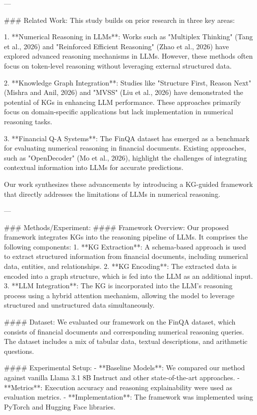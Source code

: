 ---

### Related Work:
This study builds on prior research in three key areas:

1. **Numerical Reasoning in LLMs**: Works such as "Multiplex Thinking" (Tang et al., 2026) and "Reinforced Efficient Reasoning" (Zhao et al., 2026) have explored advanced reasoning mechanisms in LLMs. However, these methods often focus on token-level reasoning without leveraging external structured data.

2. **Knowledge Graph Integration**: Studies like "Structure First, Reason Next" (Mishra and Anil, 2026) and "MVSS" (Liu et al., 2026) have demonstrated the potential of KGs in enhancing LLM performance. These approaches primarily focus on domain-specific applications but lack implementation in numerical reasoning tasks.

3. **Financial Q-A Systems**: The FinQA dataset has emerged as a benchmark for evaluating numerical reasoning in financial documents. Existing approaches, such as "OpenDecoder" (Mo et al., 2026), highlight the challenges of integrating contextual information into LLMs for accurate predictions.

Our work synthesizes these advancements by introducing a KG-guided framework that directly addresses the limitations of LLMs in numerical reasoning.

---

### Methods/Experiment:
#### Framework Overview:
Our proposed framework integrates KGs into the reasoning pipeline of LLMs. It comprises the following components:
1. **KG Extraction**: A schema-based approach is used to extract structured information from financial documents, including numerical data, entities, and relationships.
2. **KG Encoding**: The extracted data is encoded into a graph structure, which is fed into the LLM as an additional input.
3. **LLM Integration**: The KG is incorporated into the LLM's reasoning process using a hybrid attention mechanism, allowing the model to leverage structured and unstructured data simultaneously.

#### Dataset:
We evaluated our framework on the FinQA dataset, which consists of financial documents and corresponding numerical reasoning queries. The dataset includes a mix of tabular data, textual descriptions, and arithmetic questions.

#### Experimental Setup:
- **Baseline Models**: We compared our method against vanilla Llama 3.1 8B Instruct and other state-of-the-art approaches.
- **Metrics**: Execution accuracy and reasoning explainability were used as evaluation metrics.
- **Implementation**: The framework was implemented using PyTorch and Hugging Face libraries.


